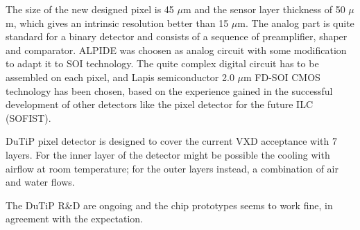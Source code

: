 The size of the new designed pixel is 45 $\mu$m and the sensor layer thickness of 50 $\mu$m, which gives an intrinsic resolution better than 15 $\mu$m. The analog part is quite standard for a binary detector and consists of a sequence of preamplifier, shaper and comparator.  ALPIDE was choosen as analog circuit with some modification to adapt it to SOI technology. 
The quite complex digital circuit has to be assembled on each pixel, and Lapis semiconductor 2.0 $\mu$m FD-SOI CMOS technology has been chosen, based on the experience gained in the successful development of other detectors like the pixel detector for the future ILC (SOFIST).

DuTiP pixel detector is designed to cover the current VXD acceptance with 7 layers. For the inner layer of the detector might be possible the cooling with airflow at room temperature; for the outer layers instead, a combination of air and water flows.

The DuTiP R\&D are ongoing and the chip prototypes seems to work fine, in agreement with the expectation. 





























